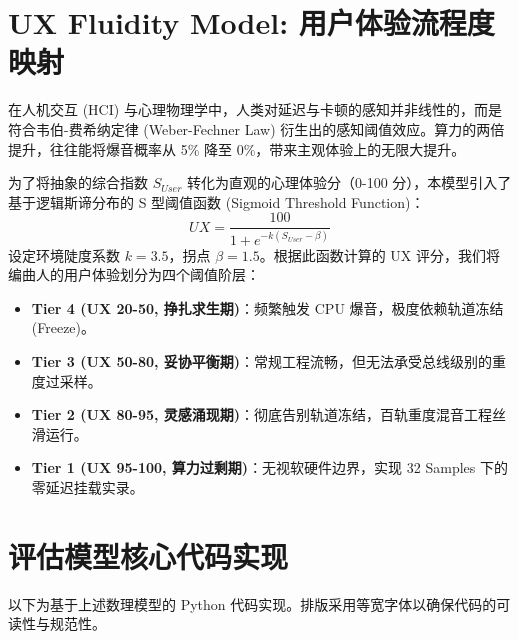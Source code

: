 \documentclass[11pt, a4paper]{article}
\begin{document}
\section{UX Fluidity Model: 用户体验流程度映射}
在人机交互 (HCI) 与心理物理学中，人类对延迟与卡顿的感知并非线性的，而是符合韦伯-费希纳定律 (Weber-Fechner Law) 衍生出的感知阈值效应\cite{gescheider1997psychophysics}。算力的两倍提升，往往能将爆音概率从 5\% 降至 0\%，带来主观体验上的无限大提升。

为了将抽象的综合指数 $S_{User}$ 转化为直观的心理体验分（0-100 分），本模型引入了基于逻辑斯谛分布的 S 型阈值函数 (Sigmoid Threshold Function)：
$$UX = \frac{100}{1 + e^{-k(S_{User} - \beta)}}$$
设定环境陡度系数 $k=3.5$，拐点 $\beta=1.5$。根据此函数计算的 UX 评分，我们将编曲人的用户体验划分为四个阈值阶层：
\begin{itemize}
    \item \textbf{Tier 4 (UX 20-50, 挣扎求生期)}：频繁触发 CPU 爆音，极度依赖轨道冻结 (Freeze)。
    \item \textbf{Tier 3 (UX 50-80, 妥协平衡期)}：常规工程流畅，但无法承受总线级别的重度过采样。
    \item \textbf{Tier 2 (UX 80-95, 灵感涌现期)}：彻底告别轨道冻结，百轨重度混音工程丝滑运行。
    \item \textbf{Tier 1 (UX 95-100, 算力过剩期)}：无视软硬件边界，实现 32 Samples 下的零延迟挂载实录。
\end{itemize}

\section{评估模型核心代码实现}
以下为基于上述数理模型的 Python 代码实现。排版采用等宽字体以确保代码的可读性与规范性。
\end{document}
